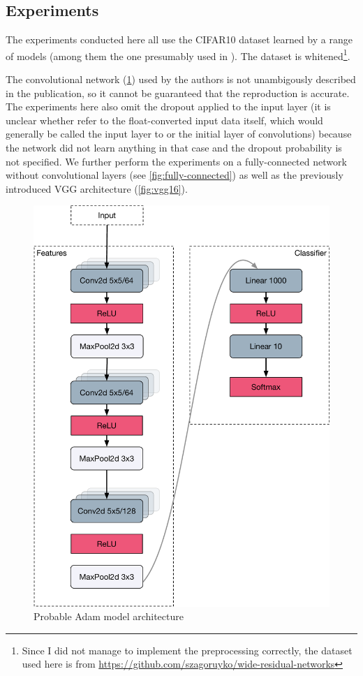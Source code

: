 \subsection{Experiments}%
\label{sub:experiments}

The experiments conducted here all use the CIFAR10 dataset learned by a range of
models (among them the one presumably used in \citet{kingma2014adam}). The
dataset is whitened\footnote{Since I did not manage to implement the
preprocessing correctly, the dataset used here is from
\url{https://github.com/szagoruyko/wide-residual-networks}}.

The convolutional network (\cref{fig:adammodel}) used by the authors is not unambigously described in
the publication, so it cannot be guaranteed that the reproduction is accurate.
The experiments here also omit the dropout applied to the input layer (it is
unclear whether \citeauthor{kingma2014adam} refer to the float-converted input
data itself, which would generally be called the input layer to or the initial
layer of convolutions) because the network did not learn anything in that case
and the dropout probability is not specified. We further perform the experiments
on a fully-connected network without convolutional layers (see
\cref{fig:fully-connected}) as well as the previously introduced VGG
architecture (\cref{fig:vgg16}).

\begin{figure}
    \centering
    \includegraphics[width=.8\linewidth]{gfx/diagrams/neural_network/adammodel.pdf}
    \caption{Probable Adam model architecture}
    \label{fig:adammodel}
\end{figure}

